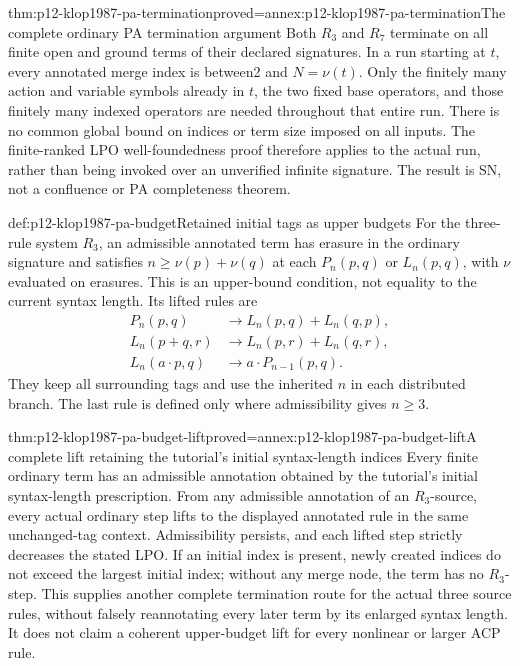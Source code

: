 \begin{hbtheorem}{thm:p12-klop1987-pa-termination}{proved=annex:p12-klop1987-pa-termination}{The complete ordinary PA termination argument}
Both \(R_3\) and \(R_7\) terminate on all finite open and ground
terms of their declared signatures. In a run starting at \(t\),
every annotated merge index is between2 and \(N=\nu(t)\).
Only the finitely many action and variable symbols already in \(t\),
the two fixed base operators, and those finitely many indexed operators
are needed throughout that entire run. There is no common global
bound on indices or term size imposed on all inputs.
The finite-ranked LPO well-foundedness proof therefore applies to
the actual run, rather than being invoked over an unverified infinite
signature. The result is SN, not a confluence or PA completeness theorem.
\end{hbtheorem}

\begin{hbdefinition}{def:p12-klop1987-pa-budget}{Retained initial tags as upper budgets}
For the three-rule system \(R_3\), an admissible annotated term
has erasure in the ordinary signature and satisfies
\(n\geq\nu(p)+\nu(q)\) at each \(P_n(p,q)\) or
\(L_n(p,q)\), with \(\nu\) evaluated on erasures.
This is an upper-bound condition, not equality to the current
syntax length. Its lifted rules are
\begin{align*}
 P_n(p,q)&\to L_n(p,q)+L_n(q,p),\\
 L_n(p+q,r)&\to L_n(p,r)+L_n(q,r),\\
 L_n(a\cdot p,q)&\to a\cdot P_{n-1}(p,q).
\end{align*}
They keep all surrounding tags and use the inherited \(n\) in
each distributed branch. The last rule is defined only where
admissibility gives \(n\geq3\).
\end{hbdefinition}

\begin{hbtheorem}{thm:p12-klop1987-pa-budget-lift}{proved=annex:p12-klop1987-pa-budget-lift}{A complete lift retaining the tutorial's initial syntax-length indices}
Every finite ordinary term has an admissible annotation obtained by
the tutorial's initial syntax-length prescription. From any admissible
annotation of an \(R_3\)-source, every actual ordinary step lifts
to the displayed annotated rule in the same unchanged-tag context.
Admissibility persists, and each lifted step strictly decreases the
stated LPO. If an initial index is present, newly created indices
do not exceed the largest initial index; without any merge node,
the term has no \(R_3\)-step. This supplies another complete termination route for the
actual three source rules, without falsely reannotating every later
term by its enlarged syntax length. It does not claim a coherent
upper-budget lift for every nonlinear or larger ACP rule.
\end{hbtheorem}

